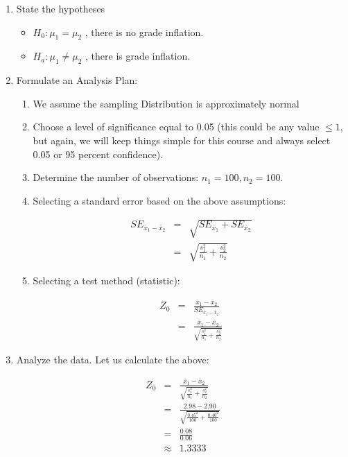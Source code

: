 \documentclass[11pt, chapterprefix=true]{scrbook}\usepackage[]{graphicx}\usepackage[]{color}
\begin{document}
\begin{enumerate}
\item State the hypotheses
  \begin{itemize}
  \item $H_0: \mu_1 = \mu_2$ ,  there is no grade inflation. 
  \item $H_a: \mu_1 \ne \mu_2$ ,  there is  grade inflation. 
  \end{itemize}
\item Formulate an Analysis Plan:
  \begin{enumerate}
  \item We assume the sampling Distribution is approximately normal
  \item Choose a level of significance equal to 0.05 (this could be any value $\le 1$,  but again, we will keep things simple for this course and always select 0.05 or 95 percent confidence).
  \item Determine the number of observations: $n_1 = 100, n_2 = 100$. 
  \item Selecting a standard error based on the above assumptions:
  
  \begin{eqnarray*}
  SE_{\bar{x}_1 - \bar{x}_2} &=& \sqrt{ SE_{\bar{x}_1} + SE_{\bar{x}_2}} \\
   &=& \sqrt{ \frac{s_1^2}{n_1} + \frac{s_2^2}{n_2}}
   \end{eqnarray*} 
 
\item Selecting a test method (statistic):

  \begin{eqnarray*}
  Z_0 &=& \frac{ \bar{x}_1 - \bar{x}_2}{SE_{\bar{x}_1 - \bar{x}_2}} \\
  &=& \frac{ \bar{x}_1 - \bar{x}_2}{ \sqrt{ \frac{s_1^2}{n_1} + \frac{s_2^2}{n_2}} }
   \end{eqnarray*} 
 \end{enumerate}
 
\item Analyze the data. Let us calculate the above:

  \begin{eqnarray*}
  Z_0 &=& \frac{ \bar{x}_1 - \bar{x}_2}{ \sqrt{ \frac{s_1^2}{n_1} + \frac{s_2^2}{n_2}} } \\
    &=& \frac{ 2.98 - 2.90 }{ \sqrt{ \frac{0.45^2 }{100} + \frac{0.40^2}{100}}} \\
    &=& \frac{ 0.08}{0.06} \\
    &\approx& 1.3333 
   \end{eqnarray*} 
   

\end{enumerate}
\end{document}
